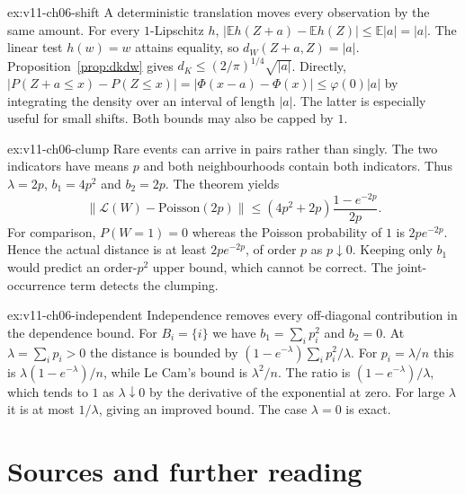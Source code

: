 \begin{solution}{ex:v11-ch06-shift}
\idea A deterministic translation moves every observation by the same amount.
\writeup For every $1$-Lipschitz $h$, $|\mathbb Eh(Z+a)-\mathbb Eh(Z)|\le\mathbb E|a|=|a|$. The linear test $h(w)=w$ attains equality, so $d_W(Z+a,Z)=|a|$. Proposition~\ref{prop:dkdw} gives $d_K\le(2/\pi)^{1/4}\sqrt{|a|}$. Directly,
$|P(Z+a\le x)-P(Z\le x)|=|\Phi(x-a)-\Phi(x)|\le\varphi(0)|a|$
by integrating the density over an interval of length $|a|$. The latter is especially useful for small shifts. Both bounds may also be capped by $1$.
\end{solution}

\begin{solution}{ex:v11-ch06-clump}
\idea Rare events can arrive in pairs rather than singly.
\writeup The two indicators have means $p$ and both neighbourhoods contain both indicators. Thus $\lambda=2p$, $b_1=4p^2$ and $b_2=2p$. The theorem yields
\[
\|\mathcal L(W)-\mathrm{Poisson}(2p)\|\le(4p^2+2p)\frac{1-e^{-2p}}{2p}.
\]
For comparison, $P(W=1)=0$ whereas the Poisson probability of $1$ is $2pe^{-2p}$. Hence the actual distance is at least $2pe^{-2p}$, of order $p$ as $p\downarrow0$. Keeping only $b_1$ would predict an order-$p^2$ upper bound, which cannot be correct. The joint-occurrence term detects the clumping.
\end{solution}

\begin{solution}{ex:v11-ch06-independent}
\idea Independence removes every off-diagonal contribution in the dependence bound.
\writeup For $B_i=\{i\}$ we have $b_1=\sum_i p_i^2$ and $b_2=0$. At $\lambda=\sum_i p_i>0$ the distance is bounded by $(1-e^{-\lambda})\sum_i p_i^2/\lambda$. For $p_i=\lambda/n$ this is $\lambda(1-e^{-\lambda})/n$, while Le Cam's bound is $\lambda^2/n$. The ratio is $(1-e^{-\lambda})/\lambda$, which tends to $1$ as $\lambda\downarrow0$ by the derivative of the exponential at zero. For large $\lambda$ it is at most $1/\lambda$, giving an improved bound. The case $\lambda=0$ is exact.
\end{solution}

\section*{Sources and further reading}

